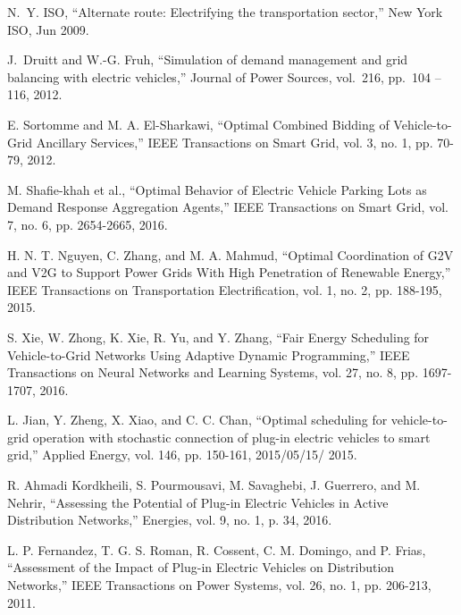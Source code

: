 N.~Y. ISO, ``Alternate route: Electrifying the transportation sector,''
  New York ISO, Jun 2009.

J.~Druitt and W.-G. Fruh, ``Simulation of demand management and grid
  balancing with electric vehicles,'' Journal of Power Sources, vol.~216,
  pp.~104 -- 116, 2012.
  
E. Sortomme and M. A. El-Sharkawi, ``Optimal Combined Bidding of Vehicle-to-Grid Ancillary Services,'' IEEE Transactions on Smart Grid, vol. 3, no. 1, pp. 70-79, 2012.

M. Shafie-khah et al., ``Optimal Behavior of Electric Vehicle Parking Lots as Demand Response Aggregation Agents,'' IEEE Transactions on Smart Grid, vol. 7, no. 6, pp. 2654-2665, 2016.  

H. N. T. Nguyen, C. Zhang, and M. A. Mahmud, ``Optimal Coordination of G2V and V2G to Support Power Grids With High Penetration of Renewable Energy,'' IEEE Transactions on Transportation Electrification, vol. 1, no. 2, pp. 188-195, 2015.

S. Xie, W. Zhong, K. Xie, R. Yu, and Y. Zhang, ``Fair Energy Scheduling for Vehicle-to-Grid Networks Using Adaptive Dynamic Programming,'' IEEE Transactions on Neural Networks and Learning Systems, vol. 27, no. 8, pp. 1697-1707, 2016.

L. Jian, Y. Zheng, X. Xiao, and C. C. Chan, ``Optimal scheduling for vehicle-to-grid operation with stochastic connection of plug-in electric vehicles to smart grid,'' Applied Energy, vol. 146, pp. 150-161, 2015/05/15/ 2015.

R. Ahmadi Kordkheili, S. Pourmousavi, M. Savaghebi, J. Guerrero, and M. Nehrir, ``Assessing the Potential of Plug-in Electric Vehicles in Active Distribution Networks,'' Energies, vol. 9, no. 1, p. 34, 2016.

L. P. Fernandez, T. G. S. Roman, R. Cossent, C. M. Domingo, and P. Frias, ``Assessment of the Impact of Plug-in Electric Vehicles on Distribution Networks,'' IEEE Transactions on Power Systems, vol. 26, no. 1, pp. 206-213, 2011.